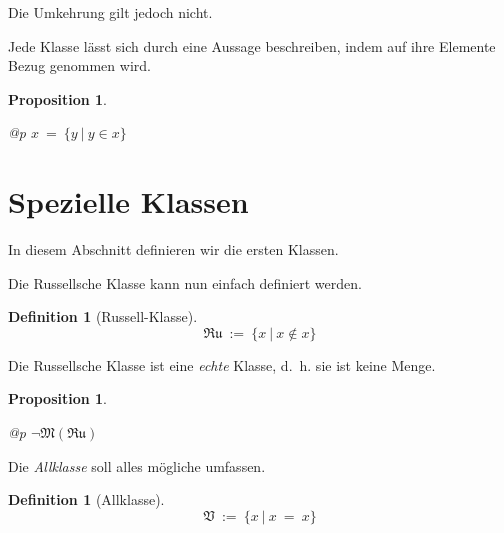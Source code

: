 \documentclass[a4paper,german,10pt,twoside]{book}
\newtheorem{prop}[thm]{Proposition}
\theoremstyle{definition}
\newtheorem{defn}[thm]{Definition}
\theoremstyle{remark}
\begin{document}
Die Umkehrung gilt jedoch nicht.


\par
Jede Klasse l{\"a}sst sich durch eine Aussage beschreiben, indem auf ihre Elemente Bezug genommen wird.

\begin{prop}
\label{theorem:classDescriptionPossible} \hypertarget{theorem:classDescriptionPossible}{}
\mbox{}
\begin{longtable}{{@{\extracolsep{\fill}}p{\linewidth}}}
\centering $x \ =  \ \{ y \ | \ y \in x \} $
\end{longtable}

\end{prop}




\section{Spezielle Klassen} \label{chapter2_section1} \hypertarget{chapter2_section1}{}
In diesem Abschnitt definieren wir die ersten Klassen.

\par
Die Russellsche Klasse kann nun einfach definiert werden.

\begin{defn}[Russell-Klasse]
\label{definition:RussellClass} \hypertarget{definition:RussellClass}{}
$$\mathfrak{Ru}\ := \ \{ x \ | \ x \notin x \} $$

\end{defn}




\par
Die Russellsche Klasse ist eine \emph{echte} Klasse, d.~h. sie ist keine Menge.

\begin{prop}
\label{theorem:RussellClassIsClass} \hypertarget{theorem:RussellClassIsClass}{}
\mbox{}
\begin{longtable}{{@{\extracolsep{\fill}}p{\linewidth}}}
\centering $\neg \mathfrak{M}(\mathfrak{Ru})$
\end{longtable}

\end{prop}




\par
Die \emph{Allklasse} soll alles m{\"o}gliche umfassen.

\begin{defn}[Allklasse]
\label{definition:universalClass} \hypertarget{definition:universalClass}{}
$$\mathfrak{V}\ := \ \{ x \ | \ x \ =  \ x \} $$

\end{defn}
\end{document}
